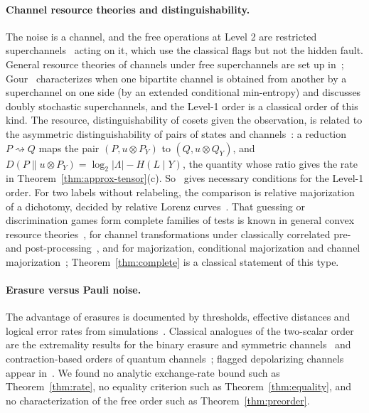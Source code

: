 \paragraph{Channel resource theories and distinguishability.}
The noise is a channel, and the free operations at Level 2 are restricted superchannels~\cite{CDP08,CDP09} acting on it, which use the classical flags but not the hidden fault. General resource theories of channels under free superchannels are set up in~\cite{LiuWinter,GourScandolo}; Gour~\cite{Gour19} characterizes when one bipartite channel is obtained from another by a superchannel on one side (by an extended conditional min-entropy) and discusses doubly stochastic superchannels, and the Level-1 order is a classical order of this kind. The resource, distinguishability of cosets given the observation, is related to the asymmetric distinguishability of pairs of states and channels~\cite{WW19,WW19ch}: a reduction $P\rightsquigarrow Q$ maps the pair $(P,u\otimes P_Y)$ to $(Q,u\otimes Q_Y)$, and $D(P\|u\otimes P_Y)=\log_2|\Lambda|-H(L\mid Y)$, the quantity whose ratio gives the rate in Theorem~\ref{thm:approx-tensor}(c). So~\cite{WW19} gives necessary conditions for the Level-1 order. For two labels without relabeling, the comparison is relative majorization of a dichotomy, decided by relative Lorenz curves~\cite{BuscemiGour}. That guessing or discrimination games form complete families of tests is known in general convex resource theories~\cite{TakagiRegula}, for channel transformations under classically correlated pre- and post-processing~\cite{RBL}, and for majorization, conditional majorization and channel majorization~\cite{BGG}; Theorem~\ref{thm:complete} is a classical statement of this type.

\paragraph{Erasure versus Pauli noise.}
The advantage of erasures is documented by thresholds, effective distances and logical error rates from simulations~\cite{SBD,WKPT,Sahay,KubicaErasure,Chang,GRK,GVRK}. Classical analogues of the two-scalar order are the extremality results for the binary erasure and symmetric channels~\cite{HircheShaya} and contraction-based orders of quantum channels~\cite{HRSF}; flagged depolarizing channels appear in~\cite{FKG}. We found no analytic exchange-rate bound such as Theorem~\ref{thm:rate}, no equality criterion such as Theorem~\ref{thm:equality}, and no characterization of the free order such as Theorem~\ref{thm:preorder}.


